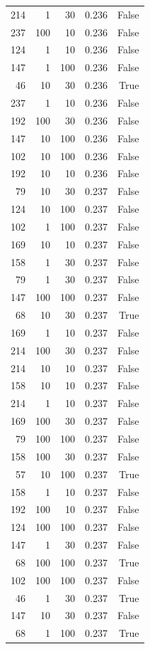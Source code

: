 \begin{tabular}{rrrrr}
214 & 1 & 30 & 0.236 & False \\
237 & 100 & 10 & 0.236 & False \\
124 & 1 & 10 & 0.236 & False \\
147 & 1 & 100 & 0.236 & False \\
46 & 10 & 30 & 0.236 & True \\
237 & 1 & 10 & 0.236 & False \\
192 & 100 & 30 & 0.236 & False \\
147 & 10 & 100 & 0.236 & False \\
102 & 10 & 100 & 0.236 & False \\
192 & 10 & 10 & 0.236 & False \\
79 & 10 & 30 & 0.237 & False \\
124 & 10 & 100 & 0.237 & False \\
102 & 1 & 100 & 0.237 & False \\
169 & 10 & 10 & 0.237 & False \\
158 & 1 & 30 & 0.237 & False \\
79 & 1 & 30 & 0.237 & False \\
147 & 100 & 100 & 0.237 & False \\
68 & 10 & 30 & 0.237 & True \\
169 & 1 & 10 & 0.237 & False \\
214 & 100 & 30 & 0.237 & False \\
214 & 10 & 10 & 0.237 & False \\
158 & 10 & 10 & 0.237 & False \\
214 & 1 & 10 & 0.237 & False \\
169 & 100 & 30 & 0.237 & False \\
79 & 100 & 100 & 0.237 & False \\
158 & 100 & 30 & 0.237 & False \\
57 & 10 & 100 & 0.237 & True \\
158 & 1 & 10 & 0.237 & False \\
192 & 100 & 10 & 0.237 & False \\
124 & 100 & 100 & 0.237 & False \\
147 & 1 & 30 & 0.237 & False \\
68 & 100 & 100 & 0.237 & True \\
102 & 100 & 100 & 0.237 & False \\
46 & 1 & 30 & 0.237 & True \\
147 & 10 & 30 & 0.237 & False \\
68 & 1 & 100 & 0.237 & True \\

\end{tabular}
